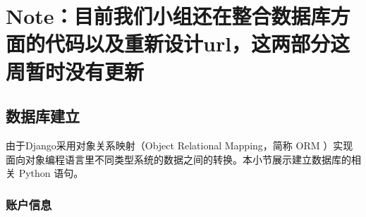 \documentclass[12pt]{article}
\begin{document}
\section*{\textbf{Note：目前我们小组还在整合数据库方面的代码以及重新设计url，这两部分这周暂时没有更新}}

\subsection{数据库建立}
由于Django采用对象关系映射（Object Relational Mapping，简称 ORM ）实现面向对象编程语言里不同类型系统的数据之间的转换。本小节展示建立数据库的相关 Python 语句。

\subsubsection{账户信息}
\end{document}
